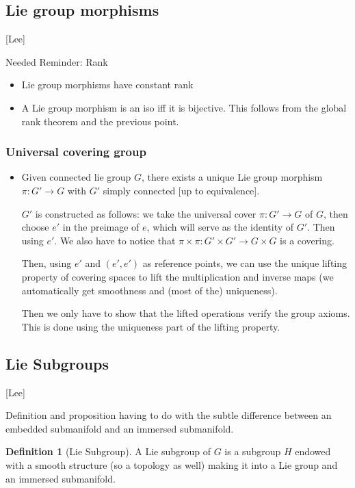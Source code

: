\documentclass{report}
\theoremstyle{definition}
\newtheorem{definition}{Definition}
\begin{document}
\subsection{Lie group morphisms}
[Lee]

Needed Reminder: Rank

\begin{itemize}
    \item Lie group morphisms have constant rank
    \item A Lie group morphism is an iso iff it is bijective. This follows from the global rank theorem and the previous point.
\end{itemize}

\subsubsection{Universal covering group}

\begin{itemize}
    \item Given connected lie group $G$, there exists a unique Lie group morphism $\pi:G'\rightarrow G$ with $G'$ simply connected [up to equivalence].

    $G'$ is constructed as follows: we take the universal cover $\pi: G'\rightarrow G$ of $G$, then choose $e'$ in the preimage of $e$, which will serve as the identity of $G'$. Then using $e'$. We also have to notice that $\pi\times\pi:G'\times G'\rightarrow G\times G$ is a covering. 
    
    Then, using $e'$ and $(e',e')$ as reference points, we can use the unique lifting property of covering spaces to lift the multiplication and inverse maps (we automatically get smoothness and (most of the) uniqueness). 
    
    Then we only have to show that the lifted operations verify the group axioms. This is done using the uniqueness part of the lifting property.
\end{itemize}

\subsection{Lie Subgroups}

[Lee]

Definition and proposition having to do with the subtle difference between an embedded submanifold and an immersed submanifold.

\begin{definition}[Lie Subgroup]
    A Lie subgroup of $G$ is a subgroup $H$ endowed with a smooth structure (so a topology as well) making it into a Lie group and an immersed submanifold.
\end{definition}
\end{document}
